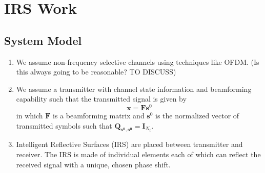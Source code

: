 \documentclass[12pt,a4paper]{report}
\begin{document}
\chapter{IRS Work}

\section{System Model}\label{system_model}

\begin{enumerate}
\item 
	We assume non-frequency selective channels using techniques like OFDM. (Is this always going to be reasonable? TO DISCUSS)
	
\item 
	We assume a transmitter with channel state information and beamforming capability such that the transmitted signal is given by 
	\begin{equation}
	\mathbf{x} = \mathbf{F}\mathbf{s}^0
	\end{equation}
	in  which $\mathbf{F}$ is a beamforming matrix and $\mathbf{s}^0$ is the normalized vector of transmitted symbols such that $\mathbf{Q_{\mathbf{s}^0,\mathbf{s}^0}} = \mathbf{I}_{N_t}$. 
	
\item Intelligent Reflective Surfaces (IRS) are placed between transmitter and receiver. The IRS is made of individual elements each of which can reflect the received signal with a unique, chosen phase shift.



\end{enumerate}
\end{document}
